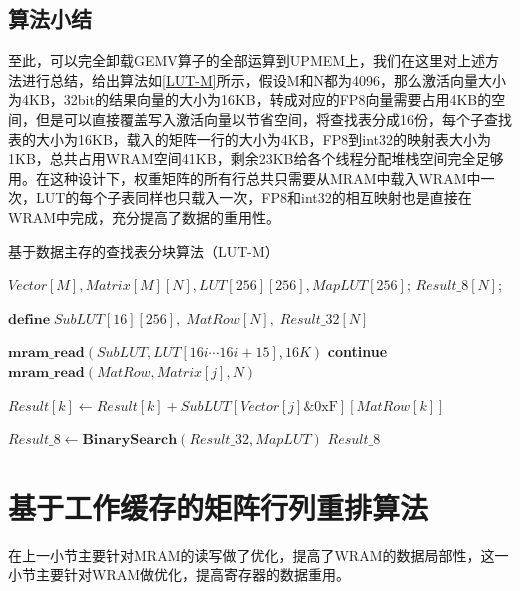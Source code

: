 \subsection{算法小结}
至此，可以完全卸载GEMV算子的全部运算到UPMEM上，我们在这里对上述方法进行总结，给出算法如\ref{LUT-M}所示，假设M和N都为4096，那么激活向量大小为4KB，32bit的结果向量的大小为16KB，转成对应的FP8向量需要占用4KB的空间，但是可以直接覆盖写入激活向量以节省空间，将查找表分成16份，每个子查找表的大小为16KB，载入的矩阵一行的大小为4KB，FP8到int32的映射表大小为1KB，总共占用WRAM空间41KB，剩余23KB给各个线程分配堆栈空间完全足够用。在这种设计下，权重矩阵的所有行总共只需要从MRAM中载入WRAM中一次，LUT的每个子表同样也只载入一次，FP8和int32的相互映射也是直接在WRAM中完成，充分提高了数据的重用性。

\begin{algorithm}[!htbp]
    \caption{基于数据主存的查找表分块算法（LUT-M）}
    \label{LUT-M}
    \begin{algorithmic}[1]
        \Require $Vector[M], Matrix[M][N], LUT[256][256], MapLUT[256]$; %
        \Ensure $Result\_8[N]$; %

        \State $\textbf{define}\; SubLUT[16][256],\;MatRow[N],\;Result\_32[N]$

            \State $\textbf{mram\_read}(SubLUT, LUT[16i \cdots 16i + 15], 16K)$
            \Comment{\textcolor{blue}{parallel in 16 for each tasklet}}
                    \State \textbf{continue}
                \EndIf
                \State $\textbf{mram\_read}(MatRow, Matrix[j], N)$
                \Comment{\textcolor{blue}{parallel in N for each tasklet}}
                
                \Comment{\textcolor{blue}{parallel in N for each tasklet}}
                    \State $Result[k] \gets Result[k] + SubLUT[Vector[j] \& \text{0xF}][MatRow[k]]$
                \EndFor
            \EndFor
        \EndFor

        \State $Result\_8 \gets \textbf{BinarySearch}(Result\_32, MapLUT)$
        \Comment{\textcolor{blue}{parallel in N for each tasklet}}
        \State \Return $Result\_8$
    \end{algorithmic}
\end{algorithm}

\section{基于工作缓存的矩阵行列重排算法}
在上一小节主要针对MRAM的读写做了优化，提高了WRAM的数据局部性，这一小节主要针对WRAM做优化，提高寄存器的数据重用。

